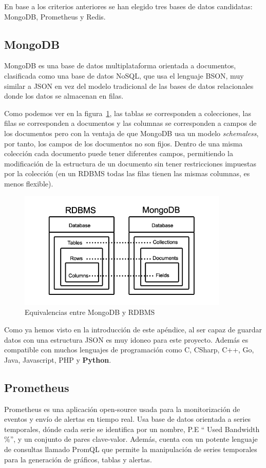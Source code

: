 En base a los criterios anteriores se han elegido tres bases de datos candidatas: MongoDB, Prometheus y Redis.

\subsection{MongoDB}
MongoDB es una base de datos multiplataforma orientada a documentos, clasificada como una base de datos NoSQL, que usa el lenguaje BSON, muy similar a JSON en vez del modelo tradicional de las bases de datos relacionales donde los datos se almacenan en filas. 

Como podemos ver en la figura~\ref{fig:Mongo_vs_RDBMS}, las tablas se corresponden a colecciones, las filas se corresponden a documentos y las columnas se corresponden a campos de los documentos pero con la ventaja de que MongoDB usa un modelo \textit{schemaless}, por tanto, los campos de los documentos no son fijos. Dentro de una misma colección cada documento puede tener diferentes campos, permitiendo la modificación de la estructura de un documento sin tener restricciones impuestas por la colección (en un RDBMS todas las filas tienen las mismas columnas, es menos flexible). 


\begin{figure}
    \centering
    \includegraphics[width=10cm]{graphics/MongoDB_vs_RMSBD}
    \caption{Equivalencias entre MongoDB y RDBMS}
    \label{fig:Mongo_vs_RDBMS}
\end{figure}

Como ya hemos visto en la introducción de este apéndice, al ser capaz de guardar datos con una estructura JSON es muy idoneo para este proyecto. Además es compatible con muchos lenguajes de programación como C, CSharp, C++, Go, Java, Javascript, PHP y \textbf{Python}.
\subsection{Prometheus}
Prometheus \cite{prometheus} es una aplicación open-source usada para la
monitorización de eventos y envío de alertas en tiempo real. Usa base de datos orientada a series temporales, dónde cada serie se identifica por un nombre, P.E \enquote{ Used Bandwidth \%}, y un conjunto de pares clave-valor. Además, cuenta con un potente lenguaje de consultas llamado PromQL que permite la manipulación de series temporales para la generación de gráficos, tablas y alertas.




